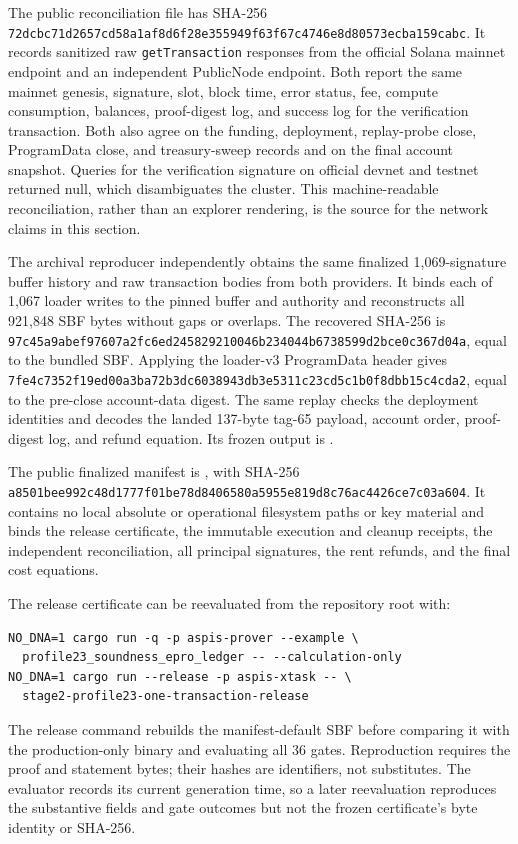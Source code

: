 The public reconciliation file
has SHA-256
\nolinkurl{72dcbc71d2657cd58a1af8d6f28e355949f63f67c4746e8d80573ecba159cabc}.
It records sanitized raw \texttt{getTransaction} responses from the official
Solana mainnet endpoint and an independent PublicNode endpoint.  Both report
the same mainnet genesis, signature, slot, block time, error status, fee,
compute consumption, balances, proof-digest log, and success log for the
verification transaction.  Both also agree on the funding, deployment,
replay-probe close, ProgramData close, and treasury-sweep records and on the
final account snapshot.  Queries for the verification signature on official
devnet and testnet returned null, which disambiguates the cluster.  This
machine-readable reconciliation, rather than an explorer rendering, is the
source for the network claims in this section.

The archival reproducer
 independently obtains the
same finalized 1,069-signature buffer history and raw transaction bodies from
both providers.  It binds each of 1,067 loader writes to the pinned buffer and
authority and reconstructs all 921,848 SBF bytes without gaps or overlaps.
The recovered SHA-256 is
\nolinkurl{97c45a9abef97607a2fc6ed245829210046b234044b6738599d2bce0c367d04a},
equal to the bundled SBF.  Applying the loader-v3 ProgramData header gives
\nolinkurl{7fe4c7352f19ed00a3ba72b3dc6038943db3e5311c23cd5c1b0f8dbb15c4cda2},
equal to the pre-close account-data digest.  The same replay checks the
deployment identities and decodes the landed 137-byte tag-65 payload, account
order, proof-digest log, and refund equation.  Its frozen output is
.

The public finalized manifest is
, with SHA-256
\nolinkurl{a8501bee992c48d1777f01be78d8406580a5955e819d8c76ac4426ce7c03a604}.
It contains no local absolute or operational filesystem paths or key material
and binds the release certificate,
the immutable execution and cleanup receipts, the independent reconciliation,
all principal signatures, the rent refunds, and the final cost equations.

The release certificate can be reevaluated from the repository root with:
\begin{verbatim}
NO_DNA=1 cargo run -q -p aspis-prover --example \
  profile23_soundness_epro_ledger -- --calculation-only
NO_DNA=1 cargo run --release -p aspis-xtask -- \
  stage2-profile23-one-transaction-release
\end{verbatim}
The release command rebuilds the manifest-default SBF before comparing it
with the production-only binary and evaluating all 36 gates.  Reproduction
requires the proof and statement bytes; their hashes are identifiers, not
substitutes.  The evaluator records its current generation time, so a later
reevaluation reproduces the substantive fields and gate outcomes but not the
frozen certificate's byte identity or SHA-256.
